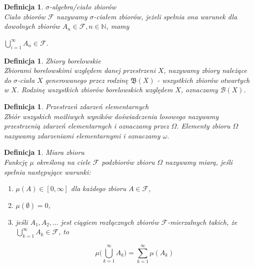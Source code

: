 \documentclass[12pt,a4paper]{report}
\newtheorem{definition}[theorem]{Definicja}
\begin{document}
\begin{definition}{$\sigma$-algebra/ciało zbiorów\cite[Rozdział 8.1]{rudnicki2006}\\}
Ciało zbiorów $\mathcal{F}$ nazywamy $\sigma$-ciałem zbiorów, jeżeli spełnia ona warunek
dla dowolnych zbiorów $A_{n} \in \mathcal{F}, n \in \mathbb{N}$, mamy
\begin{center}
$\bigcup\limits_{i=1}^{\infty} A_n \in \mathcal{F}$.
\end{center}
\end{definition}

\begin{definition}{Zbiory borelowskie \cite[w opraciu o rozdział 2]{billingsley1987}\\}
Zbiorami borelowskimi względem danej przestrzeni $X$, nazywamy zbiory należące do $\sigma$-ciała $X$ generowanego przez rodzinę $\mathfrak{B}(X)$ - wszystkich zbiorów otwartych w $X$. Rodzinę wszystkich zbiorów borelowskich względem $X$, oznaczamy $\mathcal{B}(X)$.\\
\end{definition}

\begin{definition}{Przestrzeń zdarzeń elementarnych \cite[w oparciu o rozdział 1.1]{krysicki1999}\\}
Zbiór wszyskich możliwych wyników doświadczenia losowego nazywamy przestrzenią zdarzeń elementarnych i oznaczamy przez $\Omega$. Elementy zbioru $\Omega$ nazywamy zdarzeniami elementarnymi i oznaczamy $\omega$.\\
\end{definition}

\begin{definition}{Miara zbioru \cite[Rozdział 2.10] {billingsley1987}\\}
Funkcję $\mu$ określoną na ciele $\mathcal{F}$ podzbiorów zbioru $\Omega$ nazywamy miarą, jeśli spełnia następujące warunki: 
\begin{enumerate}
\item $\mu(A) \in [0, \infty]$ dla każdego zbioru $A \in \mathcal{F}$,
\item $\mu(\emptyset)=0$,
\item jeśli $A_1, A_2,...$ jest ciągiem rozłącznych zbiorów $\mathcal{F}$-mierzalnych takich, że $\bigcup\limits_{k=1}^{\infty} A_k \in \mathcal{F}$, to 
\begin{center}
$$\mu\big(\bigcup\limits_{k=1}^{\infty} A_k\big)=\sum_{k=1}^{\infty} \mu(A_k)$$\\
\end{center}
\end{enumerate}
\end{definition}
\end{document}
